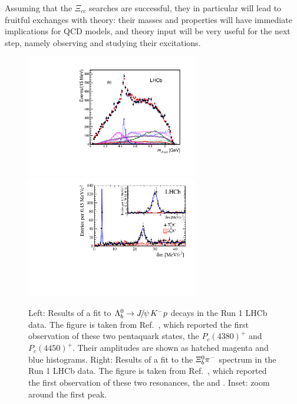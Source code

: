Assuming that the $\Xi_{cc}$
searches are successful, they in particular will lead to fruitful
exchanges with theory: their masses and properties will have
immediate implications for QCD models, and theory input will be
very useful for the next step, namely observing and studying their
excitations.




\begin{figure}[!htb]
\begin{center}
\includegraphics[width=7.5cm]{mjpsip-default.pdf} 
\includegraphics[width=7.5cm]{paperPlot-merged.pdf}
\end{center}
\caption{Left: Results of a fit to ${{\Lambda}^0_{b}} \rightarrow {\ensuremath{{J\mskip -3mu/\mskip -2mu\psi\mskip 2mu}}} {\ensuremath{{K}^-}} {\ensuremath{p}}$ decays in the Run 1 LHCb data. The figure is taken from Ref.~\cite{PAPER-2015-029}, which reported the first observation of these two pentaquark states, the $P_c(4380)^+$ and $P_c(4450)^+$. Their amplitudes are shown as hatched magenta and blue histograms.  Right: Results of a fit to the ${{\Xi}^0_{b}} {{\pi}^-}$ spectrum in the Run 1 LHCb data. The figure is taken from Ref.~\cite{PAPER-2014-061}, which reported the first observation of these two resonances, the \XibPrimeMinus and \XibStarMinus. Inset: zoom around the first peak.}%
\label{figphis}%
\end{figure}




